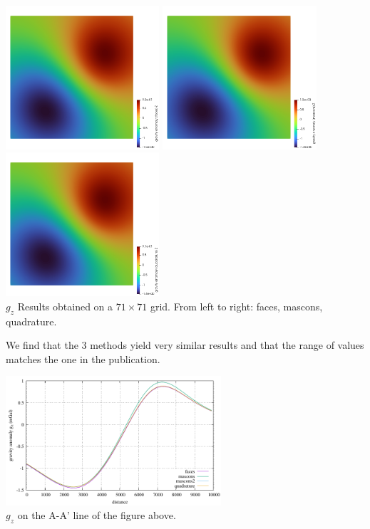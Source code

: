 \begin{center}
\includegraphics[width=5.7cm]{python_codes/fieldstone_113/results/hex_test3/g_faces}
\includegraphics[width=5.7cm]{python_codes/fieldstone_113/results/hex_test3/g_mascons}
\includegraphics[width=5.7cm]{python_codes/fieldstone_113/results/hex_test3/g_quadrature}\\
{\captionfont $g_z$ Results obtained on a $71\times71$ grid. From left to right: 
faces, mascons, quadrature.}
\end{center}

We find that the 3 methods yield very similar results and that the range
of values matches the one in the publication. 

\begin{center}
\includegraphics[width=8cm]{python_codes/fieldstone_113/results/hex_test3/line.pdf}\\
{\captionfont $g_z$ on the A-A' line of the figure above.}
\end{center}

